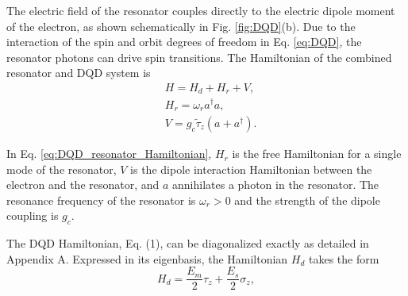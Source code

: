 \documentclass[12pt]{article}
\begin{document}
The electric field of the resonator couples directly to the electric dipole moment of the electron, as shown schematically in Fig. \ref{fig:DQD}(b). 
Due to the interaction of the spin and orbit degrees of freedom in Eq. \ref{eq:DQD}, the resonator photons can drive spin transitions. 
The Hamiltonian of the combined resonator and DQD system is
\begin{equation}\label{eq:DQD_resonator_Hamiltonian}
    \begin{aligned} 
        & H=H_d+H_r+V, \\
        & H_r=\omega_r a^{\dagger} a, \\    
    & V=g_c \tilde{\tau}_z\left(a+a^{\dagger}\right) .
    \end{aligned}
\end{equation}

In Eq. \ref{eq:DQD_resonator_Hamiltonian}, $H_r$ is the free Hamiltonian for a single mode of the resonator, $V$ is the dipole interaction Hamiltonian between the electron and the resonator, and $a$ annihilates a photon in the resonator. 
The resonance frequency of the resonator is $\omega_r>0$ and the strength of the dipole coupling is $g_c$.

The DQD Hamiltonian, Eq. (1), can be diagonalized exactly as detailed in Appendix A. Expressed in its eigenbasis, the Hamiltonian $H_d$ takes the form
\begin{equation}\label{eq:DQD_Hamiltonian_in_eigenbasis}
    H_d=\frac{E_m}{2} \tau_z+\frac{E_s}{2} \sigma_z,    
\end{equation}
\end{document}
